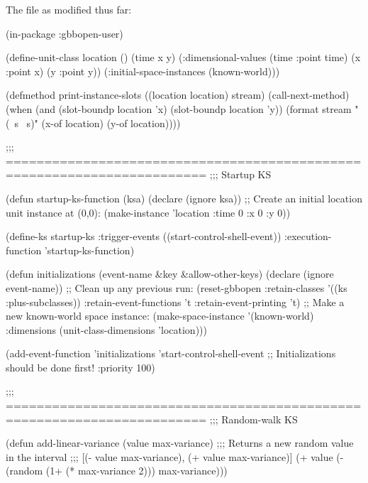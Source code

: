 \documentclass[10pt,twoside,english,pdftex]{article}
\begin{document}
\begin{tightitemize}
\item The  file as modified thus far:
\end{tightitemize}

\begin{example}
  (in-package :gbbopen-user)

  (define-unit-class location ()
    (time 
     x y)
    (:dimensional-values
      (time :point time)
      (x :point x)
      (y :point y))
    (:initial-space-instances (known-world)))

  (defmethod print-instance-slots ((location location) stream)
    (call-next-method)
    (when (and (slot-boundp location 'x)
               (slot-boundp location 'y))
      (format stream " (~s ~s)"
              (x-of location)
              (y-of location))))

  ;;; ========================================================================
  ;;;   Startup KS

  (defun startup-ks-function (ksa)
    (declare (ignore ksa))
    ;; Create an initial location unit instance at (0,0):
    (make-instance 'location :time 0 :x 0 :y 0))

  (define-ks startup-ks
      :trigger-events ((start-control-shell-event))
      :execution-function 'startup-ks-function)

  (defun initializations (event-name &key &allow-other-keys)
    (declare (ignore event-name))
    ;; Clean up any previous run:
    (reset-gbbopen :retain-classes '((ks :plus-subclasses))
                   :retain-event-functions 't
                   :retain-event-printing 't)
    ;; Make a new known-world space instance:
    (make-space-instance 
     '(known-world)
     :dimensions (unit-class-dimensions 'location)))

  (add-event-function 'initializations 'start-control-shell-event
                      ;; Initializations should be done first!
                      :priority 100)

  ;;; ========================================================================
  ;;;   Random-walk KS

  (defun add-linear-variance (value max-variance)
    ;;; Returns a new random value in the interval
    ;;; [(- value max-variance), (+ value max-variance)]
    (+ value (- (random (1+ (* max-variance 2))) max-variance)))


\end{example}
\end{document}
